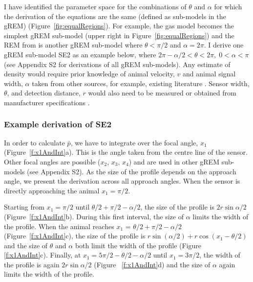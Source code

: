 I have identified the parameter space for the combinations of $\theta$ and $\alpha$ for which the derivation of the equations are the same (defined as sub-models in the gREM) (Figure~\ref{fig:equalRegions}).
For example, the gas model becomes the simplest gREM sub-model (upper right in Figure~\ref{fig:equalRegions}) and the REM from \cite{rowcliffe2008estimating} is another gREM sub-model where $\theta<\pi/2$ and $\alpha = 2\pi$.
I derive one gREM sub-model SE2 as an example below, where $2 \pi - \alpha/2 < \theta < 2\pi ,\; 0 < \alpha <\pi$ (see Appendix S2 for derivations of all gREM sub-models).
Any estimate of density would require prior knowledge of animal velocity, $v$ and animal signal width, $\alpha$ taken from other sources, for example, existing literature \cite{brinklov2011, carbone2005far}.
Sensor width, $\theta$, and detection distance, $r$ would also need to be measured or obtained from manufacturer specifications \cite{holderied2003echolocation, adams2012you}.


\subsubsection{Example derivation of SE2}

In order to calculate $\bar{p}$, we have to integrate over the focal angle, $x_1$ (Figure~\ref{f:x1AndInt}a).
This is the angle taken from the centre line of the sensor.
Other focal angles are possible ($x_2$, $x_3$, $x_4$) and are used in other gREM sub-models (see Appendix S2).
As the size of the profile depends on the approach angle, we present the derivation across all approach angles.
When the sensor is directly approaching the animal $x_1  = \pi/2$.

Starting from $x_1 = \pi/2$ until $\theta/2 + \pi/2 - \alpha/2$, the size of the profile is $2r\sin \alpha/2$ (Figure~\ref{f:x1AndInt}b).
During this first interval, the size of $\alpha$ limits the width of the profile.
When the animal reaches $x_1$  = $\theta/2 + \pi/2 - \alpha/2$ (Figure~\ref{f:x1AndInt}c), the size of the profile is $r\sin( \alpha/2) + r\cos( x_1  - \theta/2)$ and the size of $\theta$ and $\alpha$ both limit the width of the profile (Figure~ \ref{f:x1AndInt}c).
Finally, at $x_1  = 5\pi/2 - \theta/2  - \alpha/2$ until $x_1  = 3\pi/2$, the width of the profile is again $2r\sin\alpha/2$ (Figure~ \ref{f:x1AndInt}d) and the size of $\alpha$ again limits the width of the profile. 


